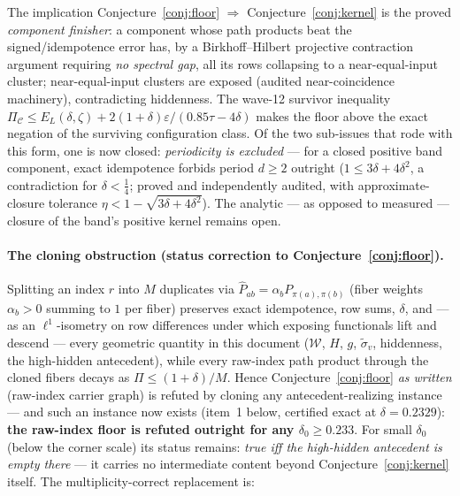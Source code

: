 \documentclass[11pt]{article}
\theoremstyle{plain}
\theoremstyle{definition}
\theoremstyle{remark}
\newcommand{\W}{\mathcal W}
\newcommand{\sigt}{\widetilde{\sigma}}
\begin{document}
\noindent The implication Conjecture~\ref{conj:floor} $\Rightarrow$
Conjecture~\ref{conj:kernel} is the proved \emph{component finisher}: a component whose
path products beat the signed/idempotence error has, by a Birkhoff--Hilbert projective
contraction argument requiring \emph{no spectral gap}, all its rows collapsing to a
near-equal-input cluster; near-equal-input clusters are exposed (audited near-coincidence
machinery), contradicting hiddenness. The wave-12 survivor inequality
$\Pi_{\mathcal C}\le E_L(\delta,\zeta)+2(1+\delta)\varepsilon/(0.85\tau-4\delta)$ makes
the floor above the exact negation of the surviving configuration class. Of the two
sub-issues that rode with this form, one is now closed: \emph{periodicity is excluded}
--- for a closed positive band component, exact idempotence forbids period $d\ge2$
outright ($1\le3\delta+4\delta^2$, a contradiction for $\delta<\tfrac14$; proved and
independently audited, with approximate-closure tolerance
$\eta<1-\sqrt{3\delta+4\delta^2}$). The analytic --- as opposed to measured --- closure
of the band's positive kernel remains open.

\paragraph{The cloning obstruction (status correction to
Conjecture~\ref{conj:floor}).} Splitting an index $r$ into $M$ duplicates via
$\widehat P_{ab}=\alpha_b P_{\pi(a),\pi(b)}$ (fiber weights $\alpha_b>0$ summing to $1$
per fiber) preserves exact idempotence, row sums, $\delta$, and --- as an
$\ell^1$-isometry on row differences under which exposing functionals lift and descend
--- every geometric quantity in this document ($\W$, $H$, $g$, $\sigt_v$, hiddenness,
the high-hidden antecedent), while every raw-index path product through the cloned
fibers decays as $\Pi\le(1+\delta)/M$. Hence Conjecture~\ref{conj:floor} \emph{as
written} (raw-index carrier graph) is refuted by cloning any antecedent-realizing
instance --- and such an instance now exists (item~1 below, certified exact at
$\delta=0.2329$): \textbf{the raw-index floor is refuted outright for any
$\delta_0\ge0.233$}. For small $\delta_0$ (below the corner scale) its status
remains: \emph{true iff the high-hidden antecedent is empty there} --- it carries no
intermediate content beyond Conjecture~\ref{conj:kernel} itself. The
multiplicity-correct replacement is:
\end{document}
